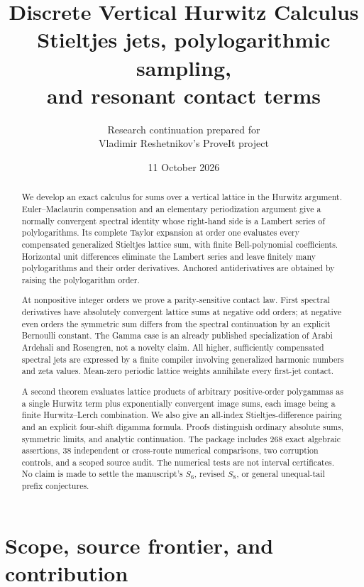 \documentclass[11pt,a4paper]{article}
\title{\textbf{Discrete Vertical Hurwitz Calculus}\\[7pt]
\large Stieltjes jets, polylogarithmic sampling,\\and resonant contact terms}
\author{Research continuation prepared for\\Vladimir Reshetnikov's ProveIt project}
\date{11 October 2026}
\numberwithin{equation}{section}
\theoremstyle{definition}
\theoremstyle{remark}
\begin{document}
\maketitle
\begin{abstract}
We develop an exact calculus for sums over a vertical lattice in the
Hurwitz argument. Euler--Maclaurin compensation and an elementary
periodization argument give a normally convergent spectral identity
whose right-hand side is a Lambert series of polylogarithms. Its complete
Taylor expansion at order one evaluates every compensated generalized
Stieltjes lattice sum, with finite Bell-polynomial coefficients. Horizontal
unit differences eliminate the Lambert series and leave finitely many
polylogarithms and their order derivatives. Anchored antiderivatives are
obtained by raising the polylogarithm order.

At nonpositive integer orders we prove a parity-sensitive contact law.
First spectral derivatives have absolutely convergent lattice sums at
negative odd orders; at negative even orders the symmetric sum differs
from the spectral continuation by an explicit Bernoulli constant. The
Gamma case is an already published specialization of Arabi Ardehali and
Rosengren, not a novelty claim. All higher, sufficiently compensated
spectral jets are expressed by a finite compiler involving generalized
harmonic numbers and zeta values. Mean-zero periodic lattice weights
annihilate every first-jet contact.

A second theorem evaluates lattice products of arbitrary positive-order
polygammas as a single Hurwitz term plus exponentially convergent image
sums, each image being a finite Hurwitz--Lerch combination. We also give
an all-index Stieltjes-difference pairing and an explicit four-shift
digamma formula. Proofs distinguish ordinary absolute sums, symmetric
limits, and analytic continuation. The package includes 268 exact
algebraic assertions, 38 independent or cross-route numerical comparisons,
two corruption controls, and a scoped source audit. The numerical tests
are not interval certificates. No claim is made to settle the manuscript's
$S_6$, revised $S_8$, or general unequal-tail prefix conjectures.
\end{abstract}
\clearpage
\tableofcontents
\clearpage

\section{Scope, source frontier, and contribution}
\end{document}

